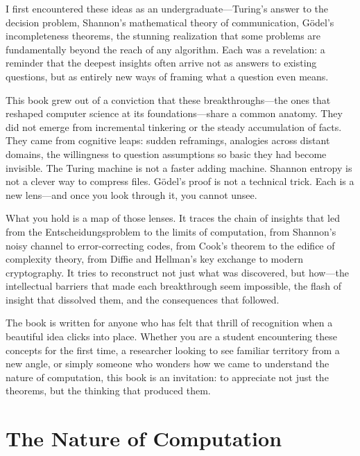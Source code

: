 \documentclass[11pt,oneside,a4paper]{book}
\theoremstyle{definition}
\theoremstyle{plain}
\theoremstyle{remark}
\begin{document}
I first encountered these ideas as an undergraduate---Turing's answer to the decision problem, Shannon's mathematical theory of communication, G{\"o}del's incompleteness theorems, the stunning realization that some problems are fundamentally beyond the reach of any algorithm. Each was a revelation: a reminder that the deepest insights often arrive not as answers to existing questions, but as entirely new ways of framing what a question even means.

This book grew out of a conviction that these breakthroughs---the ones that reshaped computer science at its foundations---share a common anatomy. They did not emerge from incremental tinkering or the steady accumulation of facts. They came from cognitive leaps: sudden reframings, analogies across distant domains, the willingness to question assumptions so basic they had become invisible. The Turing machine is not a faster adding machine. Shannon entropy is not a clever way to compress files. G{\"o}del's proof is not a technical trick. Each is a new lens---and once you look through it, you cannot unsee.

What you hold is a map of those lenses. It traces the chain of insights that led from the Entscheidungsproblem to the limits of computation, from Shannon's noisy channel to error-correcting codes, from Cook's theorem to the edifice of complexity theory, from Diffie and Hellman's key exchange to modern cryptography. It tries to reconstruct not just what was discovered, but how---the intellectual barriers that made each breakthrough seem impossible, the flash of insight that dissolved them, and the consequences that followed.

The book is written for anyone who has felt that thrill of recognition when a beautiful idea clicks into place. Whether you are a student encountering these concepts for the first time, a researcher looking to see familiar territory from a new angle, or simply someone who wonders how we came to understand the nature of computation, this book is an invitation: to appreciate not just the theorems, but the thinking that produced them.

\mainmatter

\part{The Nature of Computation}





\end{document}
